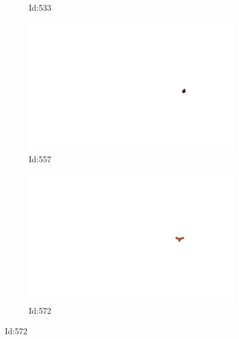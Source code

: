 \documentclass[12pt,twoside]{report}
\begin{document}
\begin{figure}
\begin{subfigure}[b]{0.20\textwidth}
\caption{Id:533}
\end{subfigure}
\begin{subfigure}[b]{0.20\textwidth}
\centering
\includegraphics[width=\textwidth]{../trajectories/557.png}
\caption{Id:557}
\end{subfigure}
\begin{subfigure}[b]{0.20\textwidth}
\centering
\includegraphics[width=\textwidth]{../trajectories/572.png}
\caption{Id:572}
\end{subfigure}
\end{figure}
\end{document}
